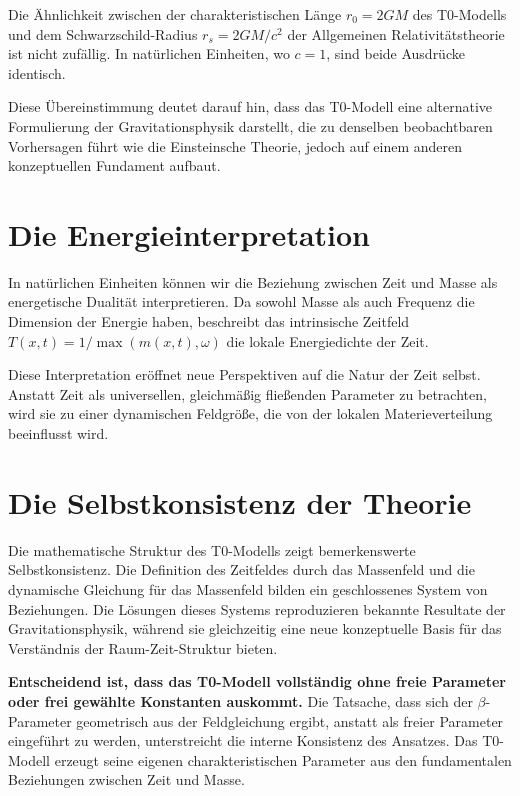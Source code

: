 \documentclass[12pt,a4paper]{report}
\begin{document}
	Die Ähnlichkeit zwischen der charakteristischen Länge $r_0 = 2GM$ des T0-Modells und dem Schwarzschild-Radius $r_s = 2GM/c^2$ der Allgemeinen Relativitätstheorie ist nicht zufällig. In natürlichen Einheiten, wo $c = 1$, sind beide Ausdrücke identisch.
	
	Diese Übereinstimmung deutet darauf hin, dass das T0-Modell eine alternative Formulierung der Gravitationsphysik darstellt, die zu denselben beobachtbaren Vorhersagen führt wie die Einsteinsche Theorie, jedoch auf einem anderen konzeptuellen Fundament aufbaut.
	
	\section{Die Energieinterpretation}
	
	In natürlichen Einheiten können wir die Beziehung zwischen Zeit und Masse als energetische Dualität interpretieren. Da sowohl Masse als auch Frequenz die Dimension der Energie haben, beschreibt das intrinsische Zeitfeld $T(x,t) = 1/\max(m(x,t), \omega)$ die lokale Energiedichte der Zeit.
	
	Diese Interpretation eröffnet neue Perspektiven auf die Natur der Zeit selbst. Anstatt Zeit als universellen, gleichmäßig fließenden Parameter zu betrachten, wird sie zu einer dynamischen Feldgröße, die von der lokalen Materieverteilung beeinflusst wird.
	
	\section{Die Selbstkonsistenz der Theorie}
	
	Die mathematische Struktur des T0-Modells zeigt bemerkenswerte Selbstkonsistenz. Die Definition des Zeitfeldes durch das Massenfeld und die dynamische Gleichung für das Massenfeld bilden ein geschlossenes System von Beziehungen. Die Lösungen dieses Systems reproduzieren bekannte Resultate der Gravitationsphysik, während sie gleichzeitig eine neue konzeptuelle Basis für das Verständnis der Raum-Zeit-Struktur bieten.
	
	\textbf{Entscheidend ist, dass das T0-Modell vollständig ohne freie Parameter oder frei gewählte Konstanten auskommt.} Die Tatsache, dass sich der $\beta$-Parameter geometrisch aus der Feldgleichung ergibt, anstatt als freier Parameter eingeführt zu werden, unterstreicht die interne Konsistenz des Ansatzes. Das T0-Modell erzeugt seine eigenen charakteristischen Parameter aus den fundamentalen Beziehungen zwischen Zeit und Masse.
	
\end{document}
